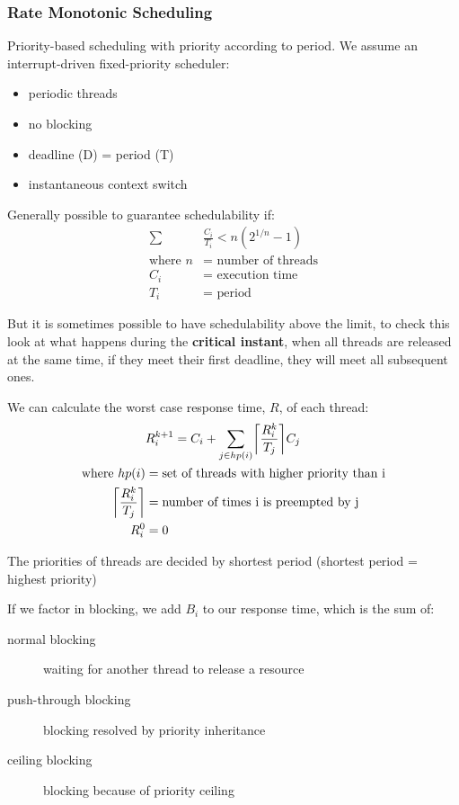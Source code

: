 \documentclass[]{article}
\theoremstyle{definition}
\DeclarePairedDelimiter{\ceil}{\lceil}{\rceil}
\begin{document}
	\subsubsection{Rate Monotonic Scheduling}
	Priority-based scheduling with priority according to period. We assume an interrupt-driven fixed-priority scheduler:
	\begin{itemize}
		\item periodic threads
		\item no blocking
		\item deadline (D) = period (T)
		\item instantaneous context switch
	\end{itemize}
	Generally possible to guarantee schedulability if:
	\begin{align*}
		\sum &\frac{C_i}{T_i} < n(2^{1/n} - 1) \\
		\text{where } n &= \text{ number of threads} \\ 
		C_i &= \text{ execution time} \\ 
		T_i &= \text{ period}
	\end{align*}
	
	But it is sometimes possible to have schedulability above the limit, to check this look at what happens during the \textbf{critical instant}, when all threads are released at the same time, if they meet their first deadline, they will meet all subsequent ones. 

	We can calculate the worst case response time, $R$, of each thread:
	\begin{align*}
		&R_i^{k+1} = C_i + \sum_{j \in hp(i)} \ceil*{\frac{R_i^k}{T_j}}C_j \\
		\text{where } hp(i) &= \text{set of threads with higher priority than i} \\
		\ceil*{\frac{R_i^k}{T_j}} &= \text{number of times i is preempted by j} \\
		R_i^0 &= 0
	\end{align*}

	The priorities of threads are decided by shortest period (shortest period = highest priority)

	
	If we factor in blocking, we add $B_i$ to our response time, which is the sum of:
	\begin{description}
		\item[normal blocking] waiting for another thread to release a resource
		\item[push-through blocking] blocking resolved by priority inheritance
		\item[ceiling blocking] blocking because of priority ceiling
	\end{description}
\end{document}
